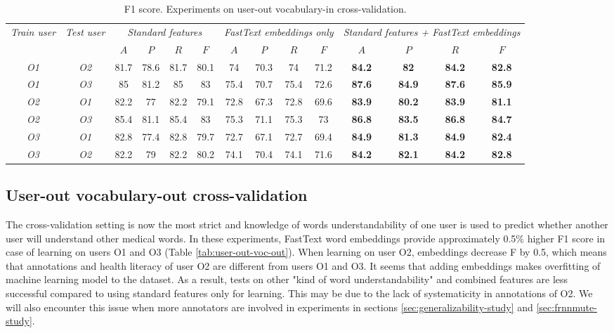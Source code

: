 \begin{table}[h]
\begin{tabular}{cc|cccc|cccc|cccc}
\multirow{2}{0.6cm}{\textit{Train user}} & \multirow{2}{0.6cm}{\textit{Test user}} & \multicolumn{4}{c|}{\textit{Standard features}} & \multicolumn{4}{c|}{\textit{FastText embeddings only}} & \multicolumn{4}{X}{\textit{Standard features + FastText embeddings}} \\ \cline{3-14} 
 &  & $A$ & $P$ & $R$ & $F$ & $A$ & $P$ & $R$ & $F$ & $A$ & $P$ & $R$ & $F$ \\ \hline
\textit{O1} & \textit{O2} & 81.7 & 78.6 & 81.7 & 80.1 & 74 & 70.3 & 74 & 71.2 & \textbf{84.2} & \textbf{82} & \textbf{84.2} & \textbf{82.8} \\  
\textit{O1} & \textit{O3} & 85 & 81.2 & 85 & 83 & 75.4 & 70.7 & 75.4 & 72.6 & \textbf{87.6} & \textbf{84.9} & \textbf{87.6} & \textbf{85.9} \\ \hline 
\textit{O2} & \textit{O1} & 82.2 & 77 & 82.2 & 79.1 & 72.8 & 67.3 & 72.8 & 69.6 & \textbf{83.9} & \textbf{80.2} & \textbf{83.9} & \textbf{81.1} \\  
\textit{O2} & \textit{O3} & 85.4 & 81.1 & 85.4 & 83 & 75.3 & 71.1 & 75.3 & 73 & \textbf{86.8} & \textbf{83.5} & \textbf{86.8} & \textbf{84.7} \\ \hline 
\textit{O3} & \textit{O1} & 82.8 & 77.4 & 82.8 & 79.7 & 72.7 & 67.1 & 72.7 & 69.4 & \textbf{84.9} & \textbf{81.3} & \textbf{84.9} & \textbf{82.4} \\  
\textit{O3} & \textit{O2} & 82.2 & 79 & 82.2 & 80.2 & 74.1 & 70.4 & 74.1 & 71.6 & \textbf{84.2} & \textbf{82.1} & \textbf{84.2} & \textbf{82.8} \\ \hline 
\end{tabular}
    \caption{F1 score. Experiments on user-out vocabulary-in cross-validation.}
    \label{tab:user-out-voc-in}
\end{table}


\subsection{User-out vocabulary-out cross-validation}
\label{sec:user-out-voc-out}

The cross-validation setting is now the most strict and knowledge of words understandability of one user is used to predict whether another user will understand other medical words. In these experiments, FastText word embeddings provide approximately 0.5\% higher F1 score in case of learning on users O1 and O3 (Table \ref{tab:user-out-voc-out}). When learning on user O2, embeddings decrease F by 0.5, which means that annotations and health literacy of user O2 are different from users O1 and O3. It seems that adding embeddings makes overfitting of machine learning model to the dataset. As a result, tests on other "kind of word understandability" and combined features are less successful compared to using standard features only for learning. This may be due to the lack of systematicity in annotations of O2. We will also encounter this issue when more annotators are involved in experiments in sections \ref{sec:generalizability-study} and \ref{sec:frnnmute-study}.

